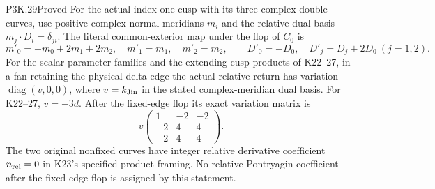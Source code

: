 \begin{statement}{P3K.29}{Proved}
For the actual index-one cusp with its three complex double curves,
use positive complex normal meridians \(m_i\) and the relative dual
basis \(m_j\cdot D_i=\delta_{ji}\). The literal common-exterior map
under the flop of \(C_0\) is
\[
 m'_0=-m_0+2m_1+2m_2,\quad m'_1=m_1,\quad m'_2=m_2,
 \qquad D'_0=-D_0,\quad D'_j=D_j+2D_0\ (j=1,2).
\]
For the scalar-parameter families and the extending cusp products
of K22--27, in a fan retaining the physical delta edge the actual
relative return has variation \(\operatorname{diag}(v,0,0)\), where
\(v=k_{\rm Jin}\) in the stated complex-meridian dual basis.
For K22--27, \(v=-3d\). After the fixed-edge flop its exact
variation matrix is
\[
 v\begin{pmatrix}1&-2&-2\\-2&4&4\\-2&4&4\end{pmatrix}.
\]
The two original nonfixed curves have integer relative derivative
coefficient \(n_{\rm rel}=0\) in K23's specified product framing.
No relative Pontryagin coefficient after the fixed-edge flop is
assigned by this statement.
\end{statement}
